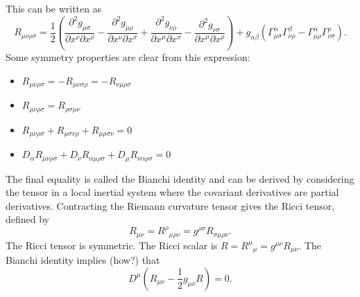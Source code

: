 \documentclass[11pt]{article}
\begin{document}
This can be written as
$$ R_{\mu \nu \rho \sigma} = \frac{1}{2} \left(\frac{\partial^2 g_{\mu \sigma}}{\partial x^\nu \partial x^\rho} - \frac{\partial^2 g_{\mu \rho}}{\partial x^\nu \partial x^\sigma} + \frac{\partial^2 g_{\nu \rho}}{\partial x^\mu \partial x^\sigma} - \frac{\partial^2 g_{\nu \sigma}}{\partial x^\mu \partial x^\rho} \right) + g_{\alpha \beta} \left( \Gamma^{\alpha}_{\mu \sigma} \Gamma^\beta_{\nu \rho} - \Gamma^\alpha_{\mu \rho} \Gamma^\rho_{\nu \sigma} \right). $$
Some symmetry properties are clear from this expression:
\begin{itemize}
\item $ R_{\mu \nu \rho \sigma} = -R_{\mu \nu \sigma \rho} = -R_{\nu \mu \rho \sigma} $
\item $ R_{\mu \nu \rho \sigma} = R_{\rho \sigma \mu \nu} $
\item $ R_{\mu \nu \rho \sigma} + R_{\mu \sigma \nu \rho} + R_{\mu \rho \sigma \nu} = 0 $
\item $ D_\alpha R_{\mu \nu \rho \sigma} + D_\nu R_{\alpha \mu \rho \sigma} + D_\mu R_{\nu \alpha \rho \sigma} = 0 $
\end{itemize}
The final equality is called the Bianchi identity and can be derived by considering the tensor in a local inertial system where the covariant derivatives are partial derivatives.
Contracting the Riemann curvature tensor gives the Ricci tensor, defined by
$$ R_{\mu \nu} = R^\rho{}_{\mu \rho \nu} = g^{\rho \sigma} R_{\sigma \mu \rho \nu}. $$
The Ricci tensor is symmetric.
The Ricci scalar is $R = R^\mu{}_\mu = g^{\mu \nu} R_{\mu \nu}$.
The Bianchi identity implies (how?) that
$$ D^\mu \left( R_{\mu \nu} - \frac{1}{2} g_{\mu \nu} R \right) = 0. $$
\end{document}
